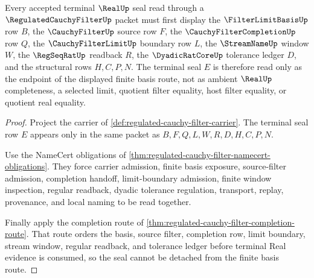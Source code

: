 \begin{theorem}
\label{thm:regulated-cauchy-filter-basis-terminal-seal}
Every accepted terminal $\RealUp$ seal read through a $\RegulatedCauchyFilterUp$ packet must first display the $\FilterLimitBasisUp$ row $B$, the $\CauchyFilterUp$ source row $F$, the $\CauchyFilterCompletionUp$ row $Q$, the $\CauchyFilterLimitUp$ boundary row $L$, the $\StreamNameUp$ window $W$, the $\RegSeqRatUp$ readback $R$, the $\DyadicRatCoreUp$ tolerance ledger $D$, and the structural rows $H,C,P,N$. The terminal seal $E$ is therefore read only as the endpoint of the displayed finite basis route, not as ambient $\RealUp$ completeness, a selected limit, quotient filter equality, host filter equality, or quotient real equality.
\end{theorem}
\begin{proof}
Project the carrier of \autoref{def:regulated-cauchy-filter-carrier}. The terminal seal row $E$ appears only in the same packet as $B,F,Q,L,W,R,D,H,C,P,N$.

Use the NameCert obligations of \autoref{thm:regulated-cauchy-filter-namecert-obligations}. They force carrier admission, finite basis exposure, source-filter admission, completion handoff, limit-boundary admission, finite window inspection, regular readback, dyadic tolerance regulation, transport, replay, provenance, and local naming to be read together.

Finally apply the completion route of \autoref{thm:regulated-cauchy-filter-completion-route}. That route orders the basis, source filter, completion row, limit boundary, stream window, regular readback, and tolerance ledger before terminal Real evidence is consumed, so the seal cannot be detached from the finite basis route.
\end{proof}



